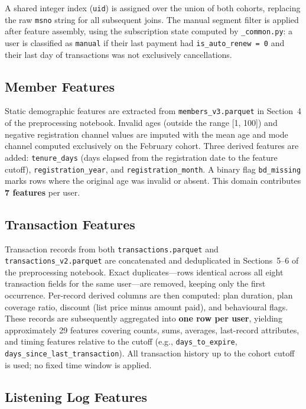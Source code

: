 \documentclass{article}
\begin{document}
A shared integer index (\texttt{uid}) is assigned over the union of both cohorts, replacing the raw \texttt{msno} string for all subsequent joins. The manual segment filter is applied after feature assembly, using the subscription state computed by \texttt{\_common.py}: a user is classified as \texttt{manual} if their last payment had \texttt{is\_auto\_renew = 0} and their last day of transactions was not exclusively cancellations.

\subsection{Member Features}

Static demographic features are extracted from \texttt{members\_v3.parquet} in Section~4 of the preprocessing notebook. Invalid ages (outside the range [1, 100]) and negative registration channel values are imputed with the mean age and mode channel computed exclusively on the February cohort. Three derived features are added: \texttt{tenure\_days} (days elapsed from the registration date to the feature cutoff), \texttt{registration\_year}, and \texttt{registration\_month}. A binary flag \texttt{bd\_missing} marks rows where the original age was invalid or absent. This domain contributes \textbf{7 features} per user.

\subsection{Transaction Features}

Transaction records from both \texttt{transactions.parquet} and \texttt{transactions\_v2.parquet} are concatenated and deduplicated in Sections~5--6 of the preprocessing notebook. Exact duplicates—rows identical across all eight transaction fields for the same user—are removed, keeping only the first occurrence. Per-record derived columns are then computed: plan duration, plan coverage ratio, discount (list price minus amount paid), and behavioural flags. These records are subsequently aggregated into \textbf{one row per user}, yielding approximately 29 features covering counts, sums, averages, last-record attributes, and timing features relative to the cutoff (e.g., \texttt{days\_to\_expire}, \texttt{days\_since\_last\_transaction}). All transaction history up to the cohort cutoff is used; no fixed time window is applied.

\subsection{Listening Log Features}
\end{document}
